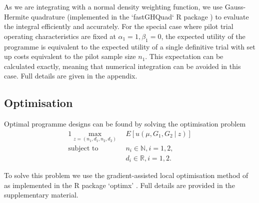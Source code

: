\documentclass[sagev, Crown]{sagej} %
\begin{document}
As we are integrating with a normal density weighting function, we use Gauss-Hermite quadrature (implemented in the `fastGHQuad` R package \cite{Blocker2018}) to evaluate the integral efficiently and accurately. %
For the special case where pilot trial operating characteristics are fixed at $\alpha_1 = 1, \beta_1 = 0$, the expected utility of the programme is equivalent to the expected utility of a single definitive trial with set up costs equivalent to the pilot sample size $n_1$. This expectation can be calculated exactly, meaning that numerical integration can be avoided in this case. Full details are given in the appendix.


\subsection{Optimisation}\label{sec:optimisation}

Optimal programme designs can be found by solving the optimisation problem
\begin{alignat}{1}\label{eqn:opt}
\max_{z = (n_1, d_1, n_2, d_2)} ~ & E[u(\mu, G_1, G_2 ~|~ z)] \\
\text{subject to} ~ & n_i \in \mathbb{N}, i=1,2, \nonumber \\ 
& d_i \in \mathbb{R}, i=1,2. \nonumber
\end{alignat}

To solve this problem we use the gradient-assisted local optimisation method of \cite{Byrd1995} as implemented in the R \cite{RCT2019} package `optimx' \cite{Nash2011}. Full details are provided in the supplementary material.


\end{document}
